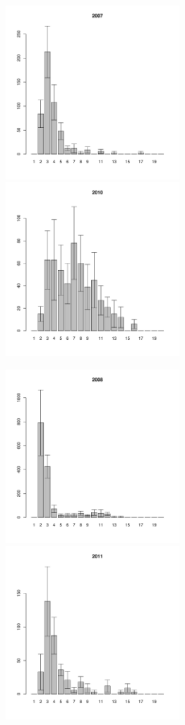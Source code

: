 
\begin{figure}[h]

\begin{multicols}{2}
\hfill
\includegraphics[width=65mm]{../White_Sea/Lomnishniy/Lomnishniy_2007_.pdf}
\hfill
\includegraphics[width=65mm]{../White_Sea/Lomnishniy/Lomnishniy_2010_.pdf}
\end{multicols}



\begin{multicols}{2}
\hfill
\includegraphics[width=65mm]{../White_Sea/Lomnishniy/Lomnishniy_2008_.pdf}
\hfill
\includegraphics[width=65mm]{../White_Sea/Lomnishniy/Lomnishniy_2011_.pdf}
\end{multicols}


\end{figure}
